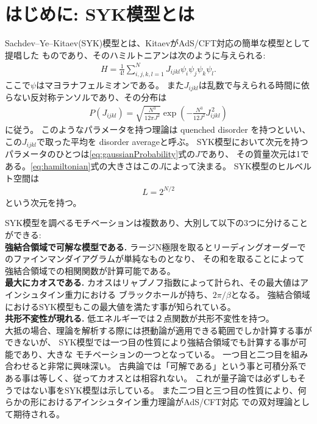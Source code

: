 \section{はじめに: SYK模型とは}
Sachdev--Ye--Kitaev(SYK)模型とは、KitaevがAdS/CFT対応の簡単な模型として提唱した
ものであり、そのハミルトニアンは次のように与えられる:
\begin{align}
  H = \frac{1}{4!}\sum_{i,j,k,l = 1}^{N} J_{ijkl}\psi_i\psi_j\psi_k\psi_l.
  \label{eq:hamiltonian}
\end{align}
ここで$\psi$はマヨラナフェルミオンである。
また$J_{ijkl}$は乱数で与えられる時間に依らない反対称テンソルであり、その分布は
\begin{align}
  P(J_{ijkl}) = \sqrt{\frac{N^3}{12\pi J^2}}
                \exp\left(-\frac{N^3}{12J^2}J_{ijkl}^{\, 2}\right)
	\label{eq:gaussianProbability}
\end{align}
に従う。
このようなパラメータを持つ理論は quenched disorder を持つといい、
この$J_{ijkl}$で取った平均を disorder averageと呼ぶ。
SYK模型において次元を持つパラメータのひとつは\eqref{eq:gaussianProbability}式の$J$であり、
その質量次元は1である。\eqref{eq:hamiltonian}式の大きさはこの$J$によって決まる。
SYK模型のヒルベルト空間は
\begin{align}
	L = 2^{N/2}
\end{align}
という次元を持つ。

SYK模型を調べるモチベーションは複数あり、大別して以下の3つに分けることができる:\\

\textbf{強結合領域で可解な模型である.}
ラージN極限を取るとリーディングオーダーでのファインマンダイアグラムが単純なものとなり、
その和を取ることによって強結合領域での相関関数が計算可能である。\\

\textbf{最大にカオスである.}
カオスはリャプノフ指数によって計られ、その最大値はアインシュタイン重力における
ブラックホールが持ち、$2\pi / \beta$となる\cite{shenker}。
強結合領域におけるSYK模型もこの最大値を満たす事が知られている\cite{maldacena}。\\

\textbf{共形不変性が現れる.}
低エネルギーでは２点関数が共形不変性を持つ。\\

大抵の場合、理論を解析する際には摂動論が適用できる範囲でしか計算する事ができないが、
SYK模型では一つ目の性質により強結合領域でも計算する事が可能であり、大きな
モチベーションの一つとなっている。
一つ目と二つ目を組み合わせると非常に興味深い。
古典論では「可解である」という事と可積分系である事は等しく、従ってカオスとは相容れない\cite{polchinski}。
これが量子論では必ずしもそうではない事をSYK模型は示している。
また二つ目と三つ目の性質により、何らかの形におけるアインシュタイン重力理論がAdS/CFT対応
での双対理論として期待される。

